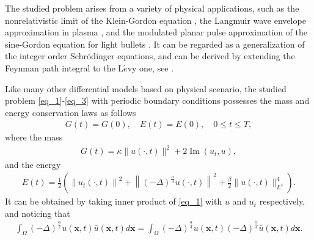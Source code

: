 \documentclass[preprint,compress,3p,10pt,fleqn]{elsarticle}
\numberwithin{equation}{section}
\begin{document}
The studied problem arises from a variety of physical applications, such as the nonrelativistic limit of the Klein-Gordon equation \cite{tsutsumiNonrelativisticApproximationNonlinear1984,machiharaNonrelativisticLimitEnergy2002}, the Langmuir wave envelope approximation in plasma \cite{colinSemidiscretizationTimeNonlinear1998}, and the modulated planar pulse approximation of the sine-Gordon equation for light bullets \cite{baoComparisonsSineGordonPerturbed2010,xinModelingLightBullets2000}. It can be regarded as a generalization of the integer order Schr{\"o}dinger equations, and can be derived by extending the Feynman path integral to the L$\acute{e}$vy one, see \cite{laskinFractionalQuantumMechanics2000,laskinFractionalSchrodingerEquation2002}.

Like many other differential models based on physical scenario, the studied problem \eqref{eq_1}-\eqref{eq_3} with periodic boundary conditions possesses the mass and energy conservation laws as follows
\begin{align}\label{eq_7}
G(t)=G(0), \quad E(t)=E(0), \quad 0 \leq t \leq T,
\end{align}
where the mass
\begin{align}\label{eq_8}
G(t)=\kappa\|u(\cdot, t)\|^{2}+2\operatorname{Im}\left(u_{t}, u\right),
\end{align}
and the energy
\begin{align}\label{eq_9}
E(t)=\frac{1}{2}\left(\left\|u_{t}(\cdot, t)\right\|^{2}+\left\|(-\Delta)^{\frac{\alpha}{4}} u(\cdot, t)\right\|^{2}+\frac{\beta}{2}\|u(\cdot, t)\|_{L^{4}}^{4}\right).
\end{align}
It can be obtained by taking inner product of \eqref{eq_1} with $u$ and $u_{t}$ respectively, and noticing that
 \begin{align} \label{eq_11223}
 	\int_{\Omega}(-\Delta)^{\frac{\alpha}{2}} u(\boldsymbol{x}, t) \bar{u}(\boldsymbol{x}, t) d \boldsymbol{x}=\int_{\Omega}(-\Delta)^{\frac{\alpha}{4}} u(\boldsymbol{x}, t)(-\Delta)^{\frac{\alpha}{4}} \bar{u}(\boldsymbol{x}, t) d \boldsymbol{x}.
 \end{align}
\end{document}

